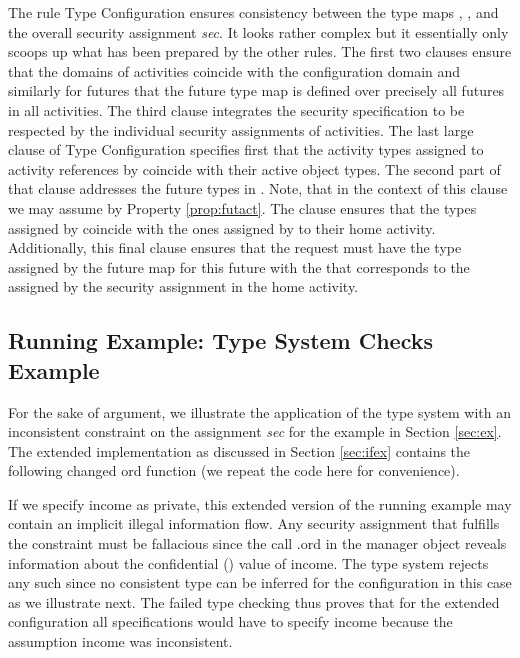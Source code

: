 \documentclass[10pt, conference, compsocconf]{IEEEtran}
\begin{document}
{The rule {\sc Type Configuration} ensures consistency between the type maps ,
, and the overall security assignment {\it sec}.
It looks rather complex but it essentially only scoops up what has been prepared by
the other rules. The first two clauses ensure that the domains of activities coincide 
with the configuration domain and similarly for futures that the future type map 
 is defined over precisely all futures
in all activities.  The third clause integrates the security specification 
 to be respected by the individual security assignments of activities. 
The last large clause of {\sc Type Configuration} specifies first that the activity types assigned 
to activity references by  coincide with their active object types.
The second part of that clause addresses the future types in . 
Note, that in the context of this clause we may assume 
 by Property \ref{prop:futact}.
The clause ensures that the types assigned by  coincide with the
ones assigned by  to their home activity.
Additionally, this final clause ensures that the request  must have the type
assigned by the future map  for this future  with the  that
corresponds to the  assigned by the security assignment in the home activity.

\subsection{Running Example: Type System Checks Example}
\label{sec:extest}
For the sake of argument, we illustrate the application of the type system
with an inconsistent constraint on the assignment {\it sec} for the example in Section \ref{sec:ex}. 
The extended implementation as discussed in Section \ref{sec:ifex} contains the following changed ord function (we repeat the code here for convenience).

\begin{small}

\end{small}

If we specify income as private, this extended version of the running example may contain an implicit 
illegal information flow.
Any security assignment  that fulfills the constraint must be fallacious
since the call .ord in the manager object  reveals information 
about the confidential () value of income. 
The type system rejects any such  since no consistent type can be inferred for the 
configuration in this case as we illustrate next. 
The failed type checking thus proves that for the extended configuration all specifications
would have to specify income  because the assumption income  was inconsistent.

}
\end{document}
